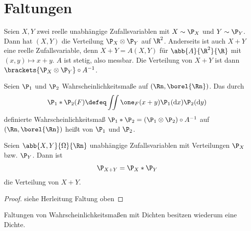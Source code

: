 \section{Faltungen}

Seien $X,Y$ zwei reelle unabhängige Zufallsvariablen mit $X \sim \P_X$ und $Y \sim \P_Y$. Dann hat $(X,Y)$ die Verteilung $\P_X \otimes \P_Y$ auf $\R^2$. Anderseits ist auch $X+Y$ eine reelle Zufallsvariable, denn $X + Y = A(X,Y)$ für $\abb{A}{\R^2}{\R}$ mit $(x,y) \mapsto x+y$. $A$ ist stetig, also messbar. Die Verteilung von $X+Y$ ist dann $\brackets{\P_X \otimes \P_Y} \circ A^{-1}$.

\begin{definition}
	Seien $\P_1$ und $\P_2$ Wahrscheinlichkeitsmaße auf $(\Rn, \borel{\Rn})$. Das durch 
	\begin{equation*}
		\P_1 \ast \P_2 (F) \defeq \iint \one_F(x+y) \P_1(\mathrm{d}x) \P_2(\mathrm{d}y)
	\end{equation*}
	definierte Wahrscheinlichkeitsmaß $\P_1 \ast \P_2 = (\P_1 \otimes \P_2) \circ A^{-1}$ auf $(\Rn, \borel{\Rn})$ heißt  von $\P_1$ und $\P_2$.
\end{definition}

\begin{satz} \label{3_25_satz}
	Seien $\abb{X,Y}{\Omega}{\Rn}$ unabhängige Zufallsvariablen mit Verteilungen $\P_X$ bzw. $\P_Y$. Dann ist 
	\begin{equation*}
		\P_{X+Y} = \P_X \ast \P_Y
	\end{equation*}
	die Verteilung von $X+Y$.
\end{satz}
\begin{proof}
	siehe Herleitung Faltung oben
\end{proof}

Faltungen von Wahrscheinlichkeitsmaßen mit Dichten besitzen wiederum eine Dichte.

